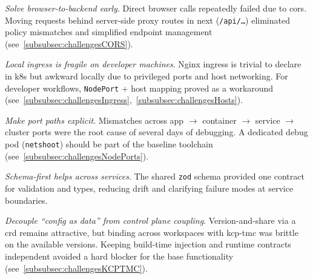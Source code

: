\documentclass[11pt, a4paper, oneside, listof=totoc]{scrartcl}
\begin{document}
            \begin{enumerate}[label={[\arabic*]:},
                ref=Challenge~\arabic*,
                leftmargin=*,
                itemsep=0.6\baselineskip]

                \item\label{chal:evalLessonsCORS}
                    \textit{Solve browser-to-backend early}.
                    Direct browser calls repeatedly failed due to \gls{cors}.
                    Moving requests behind server-side proxy routes in \gls{next} (\texttt{/api/\dots})
                    eliminated policy mismatches and simplified endpoint management
                    (see~\autoref{subsubsec:challengesCORS}).

                \item\label{chal:evalLessonsIngress}
                    \textit{Local \gls{ingress} is fragile on developer machines}.
                    Nginx \gls{ingress} is trivial to declare in \gls{k8s} but awkward locally due to
                    privileged ports and host networking.
                    For developer workflows, \texttt{NodePort} + host mapping proved as a workaround
                    (see~\autoref{subsubsec:challengesIngress},~\autoref{subsubsec:challengesHosts}).

                \item\label{Make port paths explicit}
                    \textit{Make port paths explicit}.
                    Mismatches across app $\rightarrow$ container $\rightarrow$ service
                    $\rightarrow$ cluster ports were the root cause of several days of debugging.
                    A dedicated debug pod (\texttt{netshoot}) should be part of the baseline
                    toolchain (see~\autoref{subsubsec:challengesNodePorts}).

                \item\label{chal:evalLessonsSchemaFirst}
                    \textit{Schema-first helps across services}.
                    The shared \texttt{zod} schema provided one contract for validation and types,
                    reducing drift and clarifying failure modes at service boundaries.

                \item\label{chal:evalLessonsDecoupleConfig}
                    \textit{Decouple \enquote{config as data} from control plane coupling}.
                    Version-and-share via a \gls{crd} remains attractive, but binding across
                    workspaces with \gls{kcp}-\gls{tmc} was brittle on the available versions.
                    Keeping build-time injection and runtime contracts independent avoided a hard
                    blocker for the base functionality (see~\autoref{subsubsec:challengesKCPTMC}).


\end{enumerate}
\end{document}
